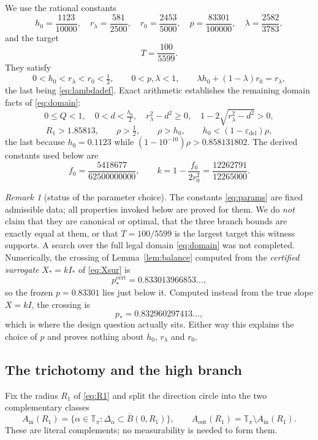 \documentclass[11pt]{article}
\theoremstyle{plain}
\theoremstyle{definition}
\theoremstyle{remark}
\newtheorem{remark}[theorem]{Remark}
\newcommand{\Tp}{\mathbb{T}_{\pi}}
\newcommand{\Ain}{A_{\mathrm{in}}}
\newcommand{\Aout}{A_{\mathrm{out}}}
\newcommand{\Istar}{I_{*}}
\newcommand{\epsdel}{\varepsilon_{\mathrm{del}}}
\begin{document}
We use the rational constants
\begin{equation}\label{eq:params}
  h_{0}=\frac{1123}{10000},\quad
  r_{\lambda}=\frac{581}{2500},\quad
  r_{0}=\frac{2453}{5000},\quad
  p=\frac{83301}{100000},\quad
  \lambda=\frac{2582}{3783},
\end{equation}
and the target
\[
  T=\frac{100}{5599}.
\]
They satisfy
\[
  0<h_{0}<r_{\lambda}<r_{0}<\tfrac12,\qquad 0<p,\lambda<1,\qquad
  \lambda h_{0}+(1-\lambda)r_{0}=r_{\lambda},
\]
the last being \eqref{eq:lambdadef}. Exact arithmetic establishes the remaining
domain facts of \eqref{eq:domain}:
\[
  0\le Q<1,\quad 0<d<\tfrac{h_{0}}{2},\quad r_{\lambda}^{2}-d^{2}\ge0,\quad
  1-2\sqrt{r_{\lambda}^{2}-d^{2}}>0,
\]
\[
  R_{1}>1.85813,\qquad \rho>\tfrac12,\qquad \rho>h_{0},
  \qquad h_{0}<(1-\epsdel)\rho ,
\]
the last because $h_{0}=0.1123$ while
$(1-10^{-10})\rho>0.858131802$.
The derived constants used below are
\[
  f_{0}=\frac{5418677}{62500000000},
  \qquad
  k=1-\frac{f_{0}}{2r_{0}^{2}}=\frac{12262791}{12265000}.
\]

\begin{remark}[status of the parameter choice]\label{rem:params}
The constants \eqref{eq:params} are fixed admissible data; all properties
invoked below are proved for them. We do \emph{not} claim that they are
canonical or optimal, that the three branch bounds are exactly equal at them, or
that $T=100/5599$ is the largest target this witness supports. A search over the
full legal domain \eqref{eq:domain} was not completed. Numerically, the crossing
of Lemma~\ref{lem:balance} computed from the \emph{certified surrogate}
$X_{*}=k\Istar$ of \eqref{eq:Xsur} is
\[
  p_{*}^{\mathrm{cert}}=0.833013966853\ldots,
\]
so the frozen $p=0.83301$ lies just below it. Computed instead from the true
slope $X=kI$, the crossing is
\[
  p_{*}=0.832960297413\ldots,
\]
which is where the design question actually sits. Either way this explains the
choice of $p$ and proves nothing about $h_{0}$, $r_{\lambda}$ and $r_{0}$.
\end{remark}

\subsection{The trichotomy and the high branch}

Fix the radius $R_{1}$ of \eqref{eq:R1} and split the direction circle into the
two complementary classes
\begin{equation}\label{eq:classesInOut}
  \Ain(R_{1})=\{\alpha\in\Tp:\Delta_{\alpha}\subset\overline B(0,R_{1})\},
  \qquad
  \Aout(R_{1})=\Tp\setminus\Ain(R_{1}).
\end{equation}
These are literal complements; no measurability is needed to form them.
\end{document}
